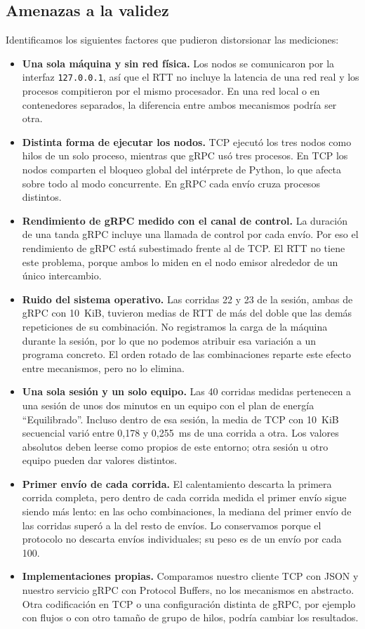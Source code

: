 \subsection{Amenazas a la validez}
\label{sec:amenazas}

Identificamos los siguientes factores que pudieron distorsionar las mediciones:

\begin{itemize}
\item \textbf{Una sola máquina y sin red física.} Los nodos se comunicaron por la interfaz \texttt{127.0.0.1}, así que el RTT no incluye la latencia de una red real y los procesos compitieron por el mismo procesador. En una red local o en contenedores separados, la diferencia entre ambos mecanismos podría ser otra.
\item \textbf{Distinta forma de ejecutar los nodos.} TCP ejecutó los tres nodos como hilos de un solo proceso, mientras que gRPC usó tres procesos. En TCP los nodos comparten el bloqueo global del intérprete de Python, lo que afecta sobre todo al modo concurrente. En gRPC cada envío cruza procesos distintos.
\item \textbf{Rendimiento de gRPC medido con el canal de control.} La duración de una tanda gRPC incluye una llamada de control por cada envío. Por eso el rendimiento de gRPC está subestimado frente al de TCP. El RTT no tiene este problema, porque ambos lo miden en el nodo emisor alrededor de un único intercambio.
\item \textbf{Ruido del sistema operativo.} Las corridas 22 y 23 de la sesión, ambas de gRPC con 10~KiB, tuvieron medias de RTT de más del doble que las demás repeticiones de su combinación. No registramos la carga de la máquina durante la sesión, por lo que no podemos atribuir esa variación a un programa concreto. El orden rotado de las combinaciones reparte este efecto entre mecanismos, pero no lo elimina.
\item \textbf{Una sola sesión y un solo equipo.} Las 40 corridas medidas pertenecen a una sesión de unos dos minutos en un equipo con el plan de energía ``Equilibrado''. Incluso dentro de esa sesión, la media de TCP con 10~KiB secuencial varió entre 0,178 y 0,255~ms de una corrida a otra. Los valores absolutos deben leerse como propios de este entorno; otra sesión u otro equipo pueden dar valores distintos.
\item \textbf{Primer envío de cada corrida.} El calentamiento descarta la primera corrida completa, pero dentro de cada corrida medida el primer envío sigue siendo más lento: en las ocho combinaciones, la mediana del primer envío de las corridas superó a la del resto de envíos. Lo conservamos porque el protocolo no descarta envíos individuales; su peso es de un envío por cada 100.
\item \textbf{Implementaciones propias.} Comparamos nuestro cliente TCP con JSON y nuestro servicio gRPC con Protocol Buffers, no los mecanismos en abstracto. Otra codificación en TCP o una configuración distinta de gRPC, por ejemplo con flujos o con otro tamaño de grupo de hilos, podría cambiar los resultados.
\end{itemize}
